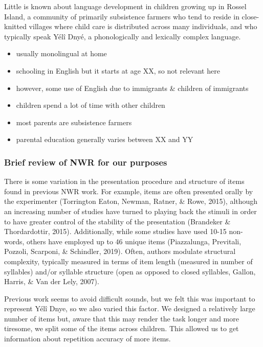\documentclass[english,,man,floatsintext]{apa6}
\providecommand{\tightlist}{%
  \setlength{\itemsep}{0pt}\setlength{\parskip}{0pt}}
\begin{document}
Little is known about language development in children growing up in
Rossel Island, a community of primarily subsistence farmers who tend to
reside in close-knitted villages where child care is distributed across
many individuals, and who typically speak Yélî Dnyé, a phonologically
and lexically complex language.

\begin{itemize}
\tightlist
\item
  usually monolingual at home
\item
  schooling in English but it starts at age XX, so not relevant here
\item
  however, some use of English due to immigrants \& children of
  immigrants
\item
  children spend a lot of time with other children
\item
  most parents are subsistence farmers
\item
  parental education generally varies between XX and YY
\end{itemize}

\subsubsection{Brief review of NWR for our
purposes}\label{brief-review-of-nwr-for-our-purposes}

There is some variation in the presentation procedure and structure of
items found in previous NWR work. For example, items are often presented
orally by the experimenter (Torrington Eaton, Newman, Ratner, \& Rowe,
2015), although an increasing number of studies have turned to playing
back the stimuli in order to have greater control of the stability of
the presentation (Brandeker \& Thordardottir, 2015). Additionally, while
some studies have used 10-15 non-words, others have employed up to 46
unique items (Piazzalunga, Previtali, Pozzoli, Scarponi, \& Schindler,
2019). Often, authors modulate structural complexity, typically measured
in terms of item length (measured in number of syllables) and/or
syllable structure (open as opposed to closed syllables, Gallon, Harris,
\& Van der Lely, 2007).

Previous work seems to avoid difficult sounds, but we felt this was
important to represent Yélî Dnye, so we also varied this factor. We
designed a relatively large number of items but, aware that this may
render the task longer and more tiresome, we split some of the items
across children. This allowed us to get information about repetition
accuracy of more items.
\end{document}

